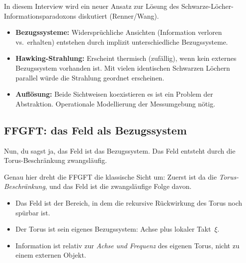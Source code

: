 \begin{geminibox}
In diesem Interview wird ein neuer Ansatz zur L\"osung des Schwarze-L\"ocher-Informationsparadoxons diskutiert (Renner/Wang).

\begin{itemize}[leftmargin=1.2em]
  \item \textbf{Bezugssysteme:} Widerspr\"uchliche Ansichten (Information verloren vs.\ erhalten) entstehen durch implizit unterschiedliche Bezugssysteme.
  \item \textbf{Hawking-Strahlung:} Erscheint thermisch (zuf\"allig), wenn kein externes Bezugssystem vorhanden ist. Mit vielen identischen Schwarzen L\"ochern parallel w\"urde die Strahlung geordnet erscheinen.
  \item \textbf{Aufl\"osung:} Beide Sichtweisen koexistieren \textendash{} es ist ein Problem der Abstraktion. Operationale Modellierung der Messumgebung n\"otig.
\end{itemize}
\end{geminibox}

\subsection{FFGFT: das Feld als Bezugssystem}

\begin{userbox}
Nun, du sagst ja, das Feld ist das Bezugssystem. Das Feld entsteht durch die Torus-Beschr\"ankung zwangsl\"aufig.
\end{userbox}

\begin{geminibox}
Genau hier dreht die FFGFT die klassische Sicht um: Zuerst ist da die \emph{Torus-Beschr\"ankung}, und das Feld ist die zwangsl\"aufige Folge davon.

\begin{itemize}[leftmargin=1.2em]
  \item Das Feld ist der Bereich, in dem die rekursive R\"uckwirkung des Torus noch sp\"urbar ist.
  \item Der Torus ist sein eigenes Bezugssystem: Achse plus lokaler Takt~$\xi$.
  \item Information ist relativ zur \emph{Achse und Frequenz} des eigenen Torus, nicht zu einem externen Objekt.
\end{itemize}
\end{geminibox}


